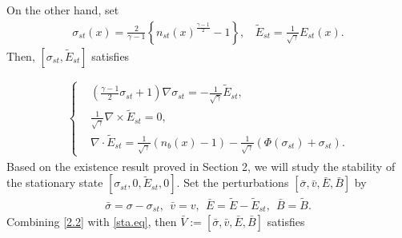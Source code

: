 \documentclass[11pt]{amsart}
\numberwithin{equation}{section}
\begin{document}
On the other hand, set
\begin{eqnarray}\label{sta.tran}
 \sigma_{st}(x)=\frac{2}{\gamma-1}\left\{n_{st}(x)^{\frac{\gamma-1}{2}}-1\right\},
 \ \ \ \
  \tilde{E}_{st}=\frac{1}{\sqrt{\gamma}}E_{st}(x).
\end{eqnarray}
Then, $[\sigma_{st},\tilde{E}_{st}]$ satisfies

\begin{eqnarray}\label{sta.eq}
\left\{\begin{aligned}
& \left(\frac{\gamma-1}{2}\sigma_{st}+1\right)\nabla\sigma_{st}=-\frac{1}{\sqrt{\gamma}}\tilde{E}_{st},\\
&\frac{1}{\sqrt{\gamma}}\nabla\times \tilde{E}_{st}=0,\\
 &\nabla \cdot
 \tilde{E}_{st}=\frac{1}{\sqrt{\gamma}}(n_{b}(x)-1)-\frac{1}{\sqrt{\gamma}}(\Phi(\sigma_{st})+\sigma_{st}).
\end{aligned}\right.
\end{eqnarray}
Based on the existence result proved in Section 2, we will study the
stability of the stationary state
$[\sigma_{st},0,\tilde{E}_{st},0]$. Set the perturbations
$[\bar{\sigma},\bar{v},\bar{E},\bar{B}]$ by
\begin{eqnarray*}
\bar{\sigma}=\sigma-\sigma_{st},\ \ \bar{v}=v,\ \
\bar{E}=\tilde{E}-\tilde{E}_{st},\ \  \bar{B}=\tilde{B}.
\end{eqnarray*}
Combining \eqref{2.2} with \eqref{sta.eq}, then
$\bar{V}:=[\bar{\sigma},\bar{v},\bar{E},\bar{B}]$ satisfies
\end{document}
